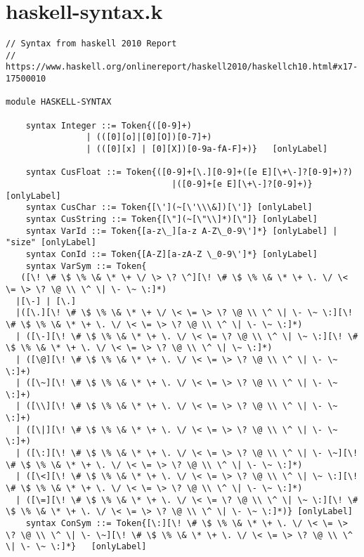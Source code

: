 \chapter{haskell-syntax.k}
\begin{lstlisting}
// Syntax from haskell 2010 Report
// https://www.haskell.org/onlinereport/haskell2010/haskellch10.html#x17-17500010

module HASKELL-SYNTAX

    syntax Integer ::= Token{([0-9]+)
                | (([0][o]|[0][O])[0-7]+) 
                | (([0][x] | [0][X])[0-9a-fA-F]+)}   [onlyLabel]

    syntax CusFloat ::= Token{([0-9]+[\.][0-9]+([e E][\+\-]?[0-9]+)?)
                                 |([0-9]+[e E][\+\-]?[0-9]+)} [onlyLabel]
    syntax CusChar ::= Token{[\'](~[\'\\\&])[\']} [onlyLabel]
    syntax CusString ::= Token{[\"](~[\"\\]*)[\"]} [onlyLabel]
    syntax VarId ::= Token{[a-z\_][a-z A-Z\_0-9\']*} [onlyLabel] | "size" [onlyLabel]
    syntax ConId ::= Token{[A-Z][a-zA-Z \_0-9\']*} [onlyLabel]
    syntax VarSym ::= Token{
   ([\! \# \$ \% \& \* \+ \/ \> \? \^][\! \# \$ \% \& \* \+ \. \/ \< \= \> \? \@ \\ \^ \| \- \~ \:]*)
  |[\-] | [\.]
  |([\.][\! \# \$ \% \& \* \+ \/ \< \= \> \? \@ \\ \^ \| \- \~ \:][\! \# \$ \% \& \* \+ \. \/ \< \= \> \? \@ \\ \^ \| \- \~ \:]*)
  | ([\-][\! \# \$ \% \& \* \+ \. \/ \< \= \? \@ \\ \^ \| \~ \:][\! \# \$ \% \& \* \+ \. \/ \< \= \> \? \@ \\ \^ \| \~ \:]*)
  | ([\@][\! \# \$ \% \& \* \+ \. \/ \< \= \> \? \@ \\ \^ \| \- \~ \:]+)
  | ([\~][\! \# \$ \% \& \* \+ \. \/ \< \= \> \? \@ \\ \^ \| \- \~ \:]+)
  | ([\\][\! \# \$ \% \& \* \+ \. \/ \< \= \> \? \@ \\ \^ \| \- \~ \:]+)
  | ([\|][\! \# \$ \% \& \* \+ \. \/ \< \= \> \? \@ \\ \^ \| \- \~ \:]+)
  | ([\:][\! \# \$ \% \& \* \+ \. \/ \< \= \> \? \@ \\ \^ \| \- \~][\! \# \$ \% \& \* \+ \. \/ \< \= \> \? \@ \\ \^ \| \- \~ \:]*)
  | ([\<][\! \# \$ \% \& \* \+ \. \/ \< \= \> \? \@ \\ \^ \| \~ \:][\! \# \$ \% \& \* \+ \. \/ \< \= \> \? \@ \\ \^ \| \- \~ \:]*)
  | ([\=][\! \# \$ \% \& \* \+ \. \/ \< \= \? \@ \\ \^ \| \~ \:][\! \# \$ \% \& \* \+ \. \/ \< \= \> \? \@ \\ \^ \| \- \~ \:]*)} [onlyLabel]
    syntax ConSym ::= Token{[\:][\! \# \$ \% \& \* \+ \. \/ \< \= \> \? \@ \\ \^ \| \- \~][\! \# \$ \% \& \* \+ \. \/ \< \= \> \? \@ \\ \^ \| \- \~ \:]*}   [onlyLabel]


\end{lstlisting}
